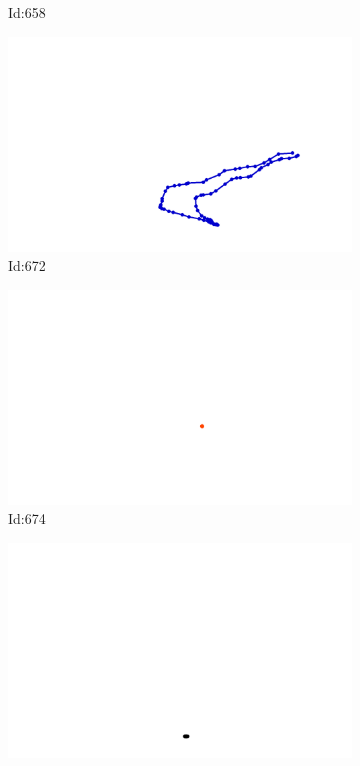 \documentclass[12pt,twoside]{report}
\begin{document}
\begin{figure}
\begin{subfigure}[b]{0.20\textwidth}
\caption{Id:658}
\end{subfigure}
\begin{subfigure}[b]{0.20\textwidth}
\centering
\includegraphics[width=\textwidth]{../trajectories/672.png}
\caption{Id:672}
\end{subfigure}
\begin{subfigure}[b]{0.20\textwidth}
\centering
\includegraphics[width=\textwidth]{../trajectories/674.png}
\caption{Id:674}
\end{subfigure}
\begin{subfigure}[b]{0.20\textwidth}
\centering
\includegraphics[width=\textwidth]{../trajectories/717.png}

\end{subfigure}
\end{figure}
\end{document}
